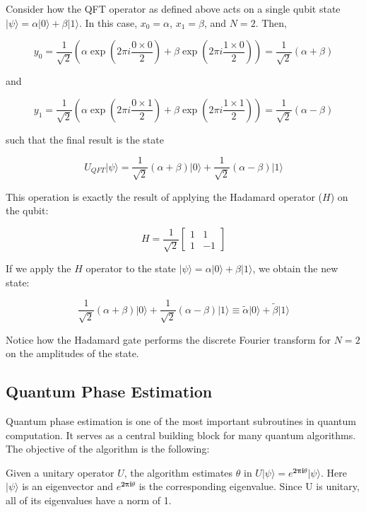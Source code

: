 \documentclass{article}
\begin{document}
Consider how the QFT operator as defined above acts on a single qubit
state
\(\vert\psi\rangle = \alpha \vert 0 \rangle + \beta \vert 1 \rangle\).
In this case, \(x_0 = \alpha\), \(x_1 = \beta\), and \(N = 2\). Then,

\[y_0 = \frac{1}{\sqrt{2}}\left(    \alpha \exp\left(2\pi i\frac{0\times0}{2}\right) + \beta \exp\left(2\pi i\frac{1\times0}{2}\right)      \right) = \frac{1}{\sqrt{2}}\left(\alpha + \beta\right)\]

and

\[y_1 = \frac{1}{\sqrt{2}}\left(    \alpha \exp\left(2\pi i\frac{0\times1}{2}\right) + \beta \exp\left(2\pi i\frac{1\times1}{2}\right)      \right) = \frac{1}{\sqrt{2}}\left(\alpha - \beta\right)\]

such that the final result is the state

\[U_{QFT}\vert\psi\rangle = \frac{1}{\sqrt{2}}(\alpha + \beta) \vert 0 \rangle + \frac{1}{\sqrt{2}}(\alpha - \beta)  \vert 1 \rangle\]

This operation is exactly the result of applying the Hadamard operator
(\(H\)) on the qubit:

\[H = \frac{1}{\sqrt{2}}\begin{bmatrix} 1 & 1 \\ 1 & -1 \end{bmatrix}\]

If we apply the \(H\) operator to the state
\(\vert\psi\rangle = \alpha \vert 0 \rangle + \beta \vert 1 \rangle\),
we obtain the new state:

\[\frac{1}{\sqrt{2}}(\alpha + \beta) \vert 0 \rangle + \frac{1}{\sqrt{2}}(\alpha - \beta)  \vert 1 \rangle 
\equiv \tilde{\alpha}\vert 0 \rangle + \tilde{\beta}\vert 1 \rangle\]

Notice how the Hadamard gate performs the discrete Fourier transform for
\(N = 2\) on the amplitudes of the state.

\subsection{Quantum Phase Estimation}

Quantum phase estimation is one of the most important subroutines in
quantum computation. It serves as a central building block for many
quantum algorithms. The objective of the algorithm is the following:

Given a unitary operator \(U\), the algorithm estimates \(\theta\) in
\(U\vert\psi \rangle =e^{\boldsymbol{2\pi i} \theta }|\psi \rangle\).
Here \(|\psi\rangle\) is an eigenvector and
\(e^{\boldsymbol{2\pi i}\theta}\) is the corresponding eigenvalue. Since
U is unitary, all of its eigenvalues have a norm of 1.
\end{document}

